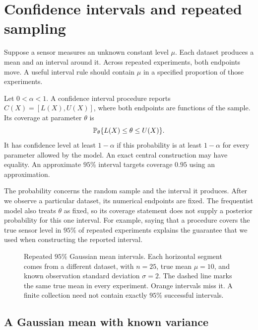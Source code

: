\section{Confidence intervals and repeated sampling}
\label{sec:confidence-coverage}

Suppose a sensor measures an unknown constant level \(\mu\). Each
dataset produces a mean and an interval around it. Across repeated
experiments, both endpoints move. A useful interval rule should contain
\(\mu\) in a specified proportion of those experiments.

\begin{definition}
Let \(0<\alpha<1\). A confidence interval procedure reports
\(C(X)=[L(X),U(X)]\), where both endpoints are functions of the sample.
Its coverage at parameter \(\theta\) is
\[
  \mathbb{P}_\theta\{L(X)\le\theta\le U(X)\}.
\]
It has confidence level at least \(1-\alpha\) if this probability is
at least \(1-\alpha\) for every parameter allowed by the model.
An exact central construction may have equality. An approximate
\(95\%\) interval targets coverage \(0.95\) using an approximation.
\end{definition}

The probability concerns the random sample and the interval it produces.
After we observe a particular dataset, its numerical endpoints are fixed.
The frequentist model also treats \(\theta\) as fixed, so its coverage
statement does not supply a posterior probability for this one interval.
For example, saying that a procedure covers the true sensor level in
\(95\%\) of repeated experiments explains the guarantee that we used
when constructing the reported interval.

\begin{figure}[H]
  \centering\InfCoveragePlot
  \caption{Repeated \(95\%\) Gaussian mean intervals. Each horizontal
  segment comes from a different dataset, with \(n=25\), true mean
  \(\mu=10\), and known observation standard deviation \(\sigma=2\).
  The dashed line marks the same true mean in every experiment. Orange
  intervals miss it. A finite collection need not contain exactly
  \(95\%\) successful intervals.}
  \label{fig:interval-coverage}
\end{figure}

\subsection{A Gaussian mean with known variance}

